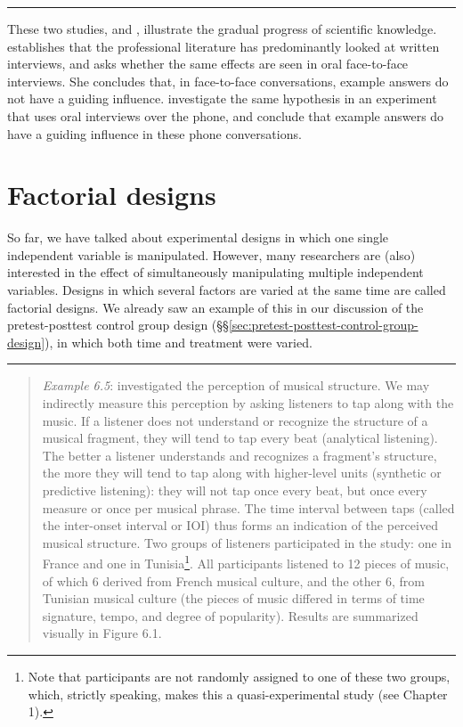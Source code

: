 \documentclass[
]{book}
\begin{document}
\begin{center}\rule{0.5\linewidth}{0.5pt}\end{center}

These two studies, \citet{Houtk91} and \citet{Wijff92}, illustrate the gradual progress of scientific knowledge. \citet{Houtk91} establishes that the professional literature has predominantly looked at written interviews, and asks whether the same effects are seen in oral face-to-face interviews. She concludes that, in face-to-face conversations, example answers do not have a guiding influence. \citet{Wijff92} investigate the same hypothesis in an experiment that uses oral interviews over the phone, and conclude that example answers do have a guiding influence in these phone conversations.

\hypertarget{sec:factorial-designs}{%
\section{Factorial designs}\label{sec:factorial-designs}}

So far, we have talked about experimental designs in which one single independent variable is manipulated. However, many researchers are (also) interested in the effect of simultaneously manipulating multiple independent variables. Designs in which several factors are varied at the same time are called factorial designs. We already saw an example of this in our discussion of the pretest-posttest control group design (§§\ref{sec:pretest-posttest-control-group-design}), in which both time and treatment were varied.

\begin{center}\rule{0.5\linewidth}{0.5pt}\end{center}

\begin{quote}
\emph{Example 6.5}: \citet{Drake03} investigated the perception of musical structure. We may indirectly measure this perception by asking listeners to tap along with the music. If a listener does not understand or recognize the structure of a musical fragment, they will tend to tap every beat (analytical listening). The better a listener understands and recognizes a fragment's structure, the more they will tend to tap along with higher-level units (synthetic or predictive listening): they will not tap once every beat, but once every measure or once per musical phrase. The time interval between taps (called the inter-onset interval or IOI) thus forms an indication of the perceived musical structure. Two groups of listeners participated in the study: one in France and one in Tunisia\footnote{Note that participants are not randomly assigned to one of these two groups, which, strictly speaking, makes this a quasi-experimental study (see Chapter 1).}. All participants listened to 12 pieces of music, of which 6 derived from French musical culture, and the other 6, from Tunisian musical culture (the pieces of music differed in terms of time signature, tempo, and degree of popularity). Results are summarized visually in Figure 6.1.
\end{quote}
\end{document}
